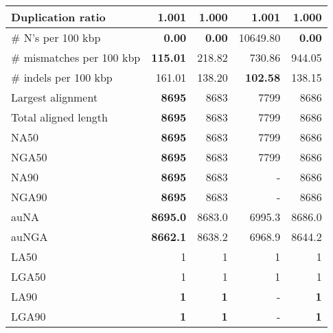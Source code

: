 \documentclass[12pt,a4paper]{article}
\begin{document}
\begin{table}[ht]
\begin{center}
\begin{tabular}{|l*{4}{|r}|}
Duplication ratio & 1.001 & {\bf 1.000} & 1.001 & {\bf 1.000} \\ \hline
\# N's per 100 kbp & {\bf 0.00} & {\bf 0.00} & 10649.80 & {\bf 0.00} \\ \hline
\# mismatches per 100 kbp & {\bf 115.01} & 218.82 & 730.86 & 944.05 \\ \hline
\# indels per 100 kbp & 161.01 & 138.20 & {\bf 102.58} & 138.15 \\ \hline
Largest alignment & {\bf 8695} & 8683 & 7799 & 8686 \\ \hline
Total aligned length & {\bf 8695} & 8683 & 7799 & 8686 \\ \hline
NA50 & {\bf 8695} & 8683 & 7799 & 8686 \\ \hline
NGA50 & {\bf 8695} & 8683 & 7799 & 8686 \\ \hline
NA90 & {\bf 8695} & 8683 & - & 8686 \\ \hline
NGA90 & {\bf 8695} & 8683 & - & 8686 \\ \hline
auNA & {\bf 8695.0} & 8683.0 & 6995.3 & 8686.0 \\ \hline
auNGA & {\bf 8662.1} & 8638.2 & 6968.9 & 8644.2 \\ \hline
LA50 & 1 & 1 & 1 & 1 \\ \hline
LGA50 & 1 & 1 & 1 & 1 \\ \hline
LA90 & {\bf 1} & {\bf 1} & - & {\bf 1} \\ \hline
LGA90 & {\bf 1} & {\bf 1} & - & {\bf 1} \\ \hline
\end{tabular}
\end{center}
\end{table}
\end{document}
